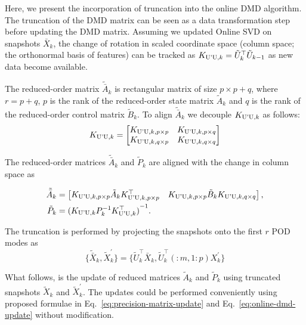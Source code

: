 Here, we present the incorporation of truncation into the online DMD algorithm. The truncation of the DMD matrix can be seen as a data transformation step before updating the DMD matrix. Assuming we updated Online SVD on snapshots \(\bar{X}_k\),
the change of rotation in scaled coordinate space (column space; the orthonormal basis of features) can be tracked as \(K _{\text{U'U}, k} = \tilde{U}_k^\top \tilde{U}_{k-1}\) as new data become available.

The reduced-order matrix \(\tilde{\bar{A}}_k\) is rectangular matrix of size \(p \times p + q\), where \(r = p + q\), \(p\) is the rank of the reduced-order state matrix \(\tilde{A}_k\) and \(q\) is the rank of the reduced-order control matrix \(\tilde{B}_k\). To align \(\tilde{\bar{A}}_k\) we decouple \(K _{\text{U'U}, k}\) as follows:
\begin{equation}
	K _{\text{U'U}, k} = \begin{bmatrix}
		K _{\text{U'U}, k, p \times p} & K _{\text{U'U}, k, p \times q} \\
		K _{\text{U'U}, k, q \times p} & K _{\text{U'U}, k, q \times q}
	\end{bmatrix}
\end{equation}

The reduced-order matrices \(\tilde{\bar{A}}_k\) and \(\tilde{P}_k\) are aligned with the change in column space as

\begin{align}
	\tilde{\bar{A}}_k & = \begin{bmatrix} K _{\text{U'U}, k, p \times p} \tilde{A}_k K _{\text{U'U}, k, p \times p}^\top & K _{\text{U'U}, k, p \times p} \tilde{B}_k K _{\text{U'U}, k, q \times q} \end{bmatrix} , \\
	\tilde{P}_k       & = {(K _{\text{U'U}, k} P_k^{-1} K _{\text{U'U}, k}^\top)}^{-1}.
\end{align}

The truncation is performed by projecting the snapshots onto the first \(r\) POD modes as
\begin{equation}
	\{\tilde{\bar{X}}_k, \tilde{X}^\prime_k\} = \{\tilde{U}^\top_k\bar{X}_k, \tilde{U}^\top_k(:m, 1:p)X^\prime_k\}
\end{equation}

What follows, is the update of reduced matrices \(\tilde{A}_k\) and \(\tilde{P}_k\) using truncated snapshots \(\tilde{X}_k\) and \(\tilde{X}^\prime_k\). The updates could be performed conveniently using proposed formulae in Eq.~\eqref{eq:precision-matrix-update} and Eq.~\eqref{eq:online-dmd-update} without modification.

